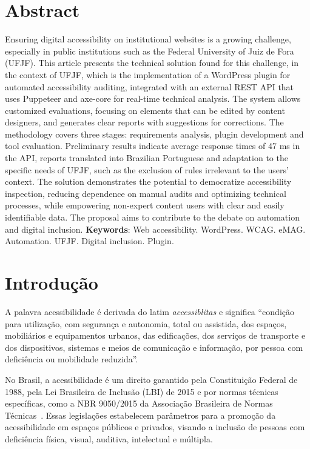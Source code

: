 \documentclass[
    12pt,
    a4paper,
    oneside,
    brazil,
    english
]{article}
\begin{document}
\section*{Abstract}
Ensuring digital accessibility on institutional websites is a growing challenge, especially
in public institutions such as the Federal University of Juiz de Fora (UFJF). This article 
presents the technical solution found for this challenge, in the context of UFJF, which is the 
implementation of a WordPress plugin for automated accessibility auditing, integrated with 
an external REST API that uses Puppeteer and axe-core for real-time technical analysis. The 
system allows customized evaluations, focusing on elements that can be edited by content 
designers, and generates clear reports with suggestions for corrections. The methodology covers 
three stages: requirements analysis, plugin development and tool evaluation. Preliminary results 
indicate average response times of 47 ms in the API, reports translated into Brazilian Portuguese 
and adaptation to the specific needs of UFJF, such as the exclusion of rules irrelevant to the 
users' context. The solution demonstrates the potential to democratize accessibility inspection, 
reducing dependence on manual audits and optimizing technical processes, while empowering 
non-expert content users with clear and easily identifiable data. The proposal aims to contribute 
to the debate on automation and digital inclusion.
\bigbreak
\noindent
\textbf{Keywords}: Web accessibility. WordPress. WCAG. eMAG. Automation. UFJF. Digital inclusion. Plugin.

\section*{Introdução}

A palavra acessibilidade é derivada do latim \textit{accessiblitas}
e significa ``condição para utilização, com segurança e autonomia,
total ou assistida, dos espaços, mobiliários e equipamentos urbanos, das
edificações, dos serviços de transporte e dos dispositivos, sistemas e meios de
comunicação e informação, por pessoa com deficiência ou mobilidade reduzida''\cite{CD}.

No Brasil, a acessibilidade é um direito garantido pela Constituição
Federal de 1988, pela Lei Brasileira de Inclusão (LBI) de 2015 \cite{LBI}
e por normas técnicas específicas, como a NBR 9050/2015 da Associação
Brasileira de Normas Técnicas~\cite{ABNT}. Essas legislações estabelecem
parâmetros para a promoção da acessibilidade em espaços públicos e privados,
visando a inclusão de pessoas com deficiência física, visual, auditiva,
intelectual e múltipla.
\end{document}
